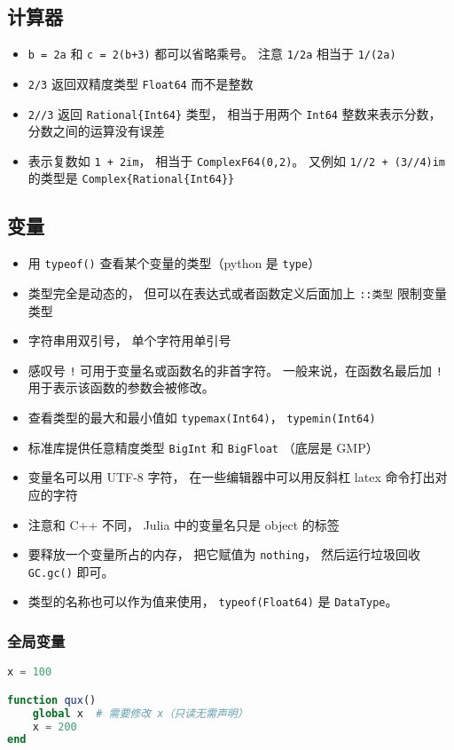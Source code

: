 \subsection{计算器}
\begin{itemize}
\item \verb`b = 2a` 和 \verb`c = 2(b+3)` 都可以省略乘号。 注意 \verb`1/2a` 相当于 \verb`1/(2a)`
\item \verb`2/3` 返回双精度类型 \verb`Float64` 而不是整数
\item \verb`2//3` 返回 \verb`Rational{Int64}` 类型， 相当于用两个 \verb`Int64` 整数来表示分数， 分数之间的运算没有误差
\item 表示复数如 \verb`1 + 2im`， 相当于 \verb`ComplexF64(0,2)`。 又例如 \verb`1//2 + (3//4)im` 的类型是 \verb`Complex{Rational{Int64}}`
\end{itemize}

\subsection{变量}
\begin{itemize}
\item 用 \verb`typeof()` 查看某个变量的类型（python 是 \verb`type`）
\item 类型完全是动态的， 但可以在表达式或者函数定义后面加上 \verb`::类型` 限制变量类型
\item 字符串用双引号， 单个字符用单引号
\item 感叹号 \verb`!` 可用于变量名或函数名的非首字符。 一般来说，在函数名最后加 \verb`!` 用于表示该函数的参数会被修改。
\item 查看类型的最大和最小值如 \verb`typemax(Int64)`， \verb`typemin(Int64)`
\item 标准库提供任意精度类型 \verb`BigInt` 和 \verb`BigFloat` （底层是 GMP）
\item 变量名可以用 UTF-8 字符， 在一些编辑器中可以用反斜杠 latex 命令打出对应的字符
\item 注意和 C++ 不同， Julia 中的变量名只是 object 的标签
\item 要释放一个变量所占的内存， 把它赋值为 \verb`nothing`， 然后运行垃圾回收 \verb`GC.gc()` 即可。
\item 类型的名称也可以作为值来使用， \verb`typeof(Float64)` 是 \verb`DataType`。
\end{itemize}

\subsubsection{全局变量}
\begin{lstlisting}[language=julia]
x = 100

function qux()
    global x  # 需要修改 x（只读无需声明）
    x = 200
end
\end{lstlisting}

